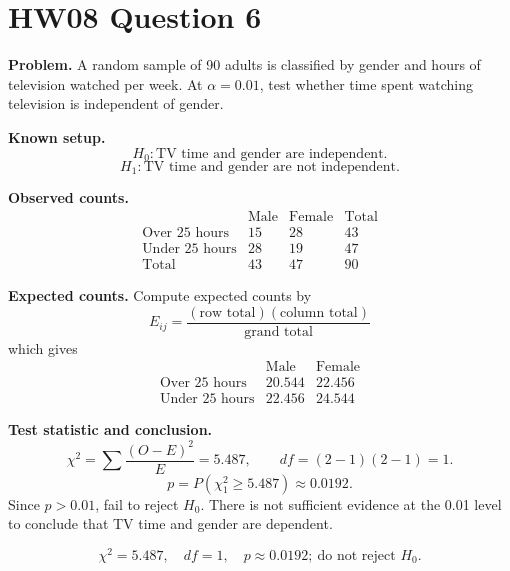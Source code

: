 \documentclass[11pt]{article}
\begin{document}
\section*{HW08 Question 6}

\textbf{Problem.} A random sample of 90 adults is classified by gender and hours of television watched per week. At \(\alpha=0.01\), test whether time spent watching television is independent of gender.

\textbf{Known setup.}
\[
H_0:\text{TV time and gender are independent.}
\]
\[
H_1:\text{TV time and gender are not independent.}
\]

\textbf{Observed counts.}
\[
\begin{array}{c|cc|c}
 & \text{Male} & \text{Female} & \text{Total}\\ \hline
\text{Over 25 hours} & 15 & 28 & 43\\
\text{Under 25 hours} & 28 & 19 & 47\\ \hline
\text{Total} & 43 & 47 & 90
\end{array}
\]

\textbf{Expected counts.} Compute expected counts by
\[
E_{ij}=\frac{(\text{row total})(\text{column total})}{\text{grand total}}
\]
which gives
\[
\begin{array}{c|cc}
 & \text{Male} & \text{Female}\\ \hline
\text{Over 25 hours} & 20.544 & 22.456\\
\text{Under 25 hours} & 22.456 & 24.544
\end{array}
\]

\textbf{Test statistic and conclusion.}
\[
\chi^2=\sum \frac{(O-E)^2}{E}=5.487,\qquad df=(2-1)(2-1)=1.
\]
\[
p=P(\chi^2_1\ge5.487)\approx0.0192.
\]
Since \(p>0.01\), fail to reject \(H_0\). There is not sufficient evidence at the 0.01 level to conclude that TV time and gender are dependent.

\[
\boxed{\chi^2=5.487,\quad df=1,\quad p\approx0.0192;\ \text{do not reject }H_0.}
\]
\end{document}
